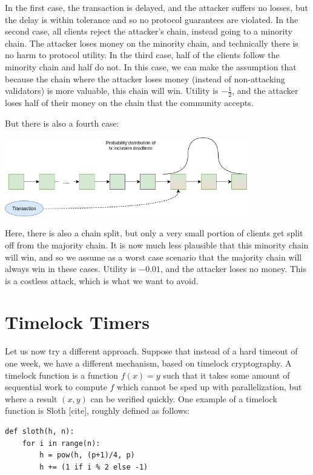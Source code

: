 \documentclass[12pt]{article}
\begin{document}
In the first case, the transaction is delayed, and the attacker suffers no losses, but the delay is within tolerance and so no protocol guarantees are violated. In the second case, all clients reject the attacker's chain, instead going to a minority chain. The attacker loses money on the minority chain, and technically there is no harm to protocol utility. In the third case, half of the clients follow the minority chain and half do not. In this case, we can make the assumption that because the chain where the attacker loses money (instead of non-attacking validators) is more valuable, this chain will win. Utility is $-\frac{1}{2}$, and the attacker loses half of their money on the chain that the community accepts.

But there is also a fourth case:

\includegraphics[width=400px]{Censorship6d.png}

Here, there is also a chain split, but only a very small portion of clients get split off from the majority chain. It is now much less plausible that this minority chain will win, and so we assume as a worst case scenario that the majority chain will always win in these cases. Utility is $-0.01$, and the attacker loses no money. This is a costless attack, which is what we want to avoid.

\section{Timelock Timers}

Let us now try a different approach. Suppose that instead of a hard timeout of one week, we have a different mechanism, based on timelock cryptography. A timelock function is a function $f(x) = y$ such that it takes some amount of sequential work to compute $f$ which cannot be sped up with parallelization, but where a result $(x, y)$ can be verified quickly. One example of a timelock function is Sloth [cite], roughly defined as follows:

\begin{verbatim}
def sloth(h, n):
    for i in range(n):
        h = pow(h, (p+1)/4, p)
        h += (1 if i % 2 else -1)
\end{verbatim}
\end{document}
